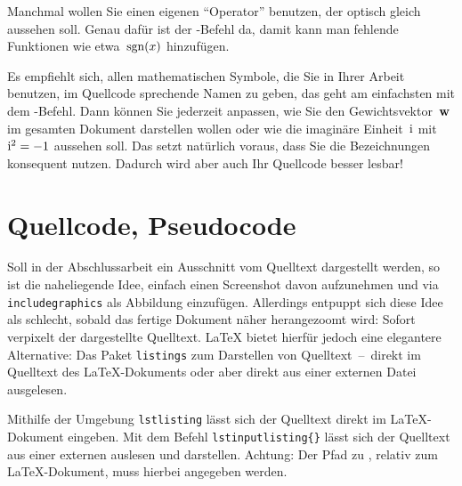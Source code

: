 \par
Manchmal wollen Sie einen eigenen \enquote{Operator} benutzen, der optisch gleich aussehen soll. Genau dafür ist der -Befehl da, damit kann man fehlende Funktionen wie etwa~$\operatorname{sgn}(x)$ hinzufügen.
\par
Es empfiehlt sich, allen mathematischen Symbole, die Sie in Ihrer Arbeit benutzen, im Quellcode sprechende Namen zu geben, das geht am einfachsten mit dem -Befehl. Dann können Sie jederzeit anpassen, wie Sie den Gewichtsvektor~$\mathbf{w}$ im gesamten Dokument darstellen wollen oder wie die imaginäre Einheit~$\mathrm{i}$ mit~$\mathrm{i}^2 = -1$ aussehen soll. Das setzt natürlich voraus, dass Sie die Bezeichnungen konsequent nutzen. Dadurch wird aber auch Ihr Quellcode besser lesbar!
%
%
\section{Quellcode, Pseudocode}
\label{sec:listing}
%
%
Soll in der Abschlussarbeit ein Ausschnitt vom Quelltext dargestellt werden, so ist die naheliegende Idee, einfach einen Screenshot davon aufzunehmen und via \texttt{\tb includegraphics} als Abbildung einzufügen. Allerdings entpuppt sich diese Idee als schlecht, sobald das fertige Dokument näher herangezoomt wird: Sofort verpixelt der dargestellte Quelltext. \LaTeX{} bietet hierfür jedoch eine elegantere Alternative: Das Paket \texttt{listings} zum Darstellen von Quelltext~--~direkt im Quelltext des \LaTeX-Dokuments oder aber direkt aus einer externen Datei ausgelesen.

Mithilfe der Umgebung \texttt{lstlisting} lässt sich der Quelltext direkt im \LaTeX-Dokument eingeben. Mit dem Befehl \texttt{\tb lstinputlisting\{\}} lässt sich der Quelltext aus einer externen  auslesen und darstellen. Achtung: Der Pfad zu , relativ zum \LaTeX-Dokument, muss hierbei angegeben werden.

